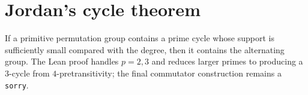\section{Jordan's cycle theorem}

\begin{theorem}
\label{thm:jordan-cycle}
\notready
If a primitive permutation group contains a prime cycle whose support is sufficiently small compared with the degree, then it contains the alternating group. The Lean proof handles $p=2,3$ and reduces larger primes to producing a $3$-cycle from $4$-pretransitivity; the final commutator construction remains a \texttt{sorry}.
\end{theorem}

